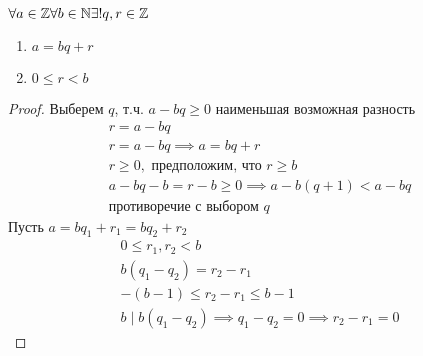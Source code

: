 \documentclass[main]{subfiles}
\begin{document}
\begin{theorem}
    $\forall a \in \mathbb{Z} \forall b \in \mathbb{N} \exists! q,r \in \mathbb{Z}$
    \begin{enumerate}
        \item $a=bq +r$
        \item $0 \le r < b$
    \end{enumerate}
\end{theorem}
\begin{proof}
    Выберем  $q$, т.ч. $a-bq\ge 0$ наименьшая возможная разность
    \begin{gather*}
        r = a-bq\\
        r = a -bq \implies a = bq+r\\
        r \ge 0, \text{ предположим, что } r \ge b\\
        a-bq-b=r-b \ge 0 \implies a - b(q+1) < a -bq\\
        \text{противоречие с выбором } q
    \end{gather*}
    Пусть $a = bq_1 + r_1 = bq_2+r_2$
    \begin{gather*}
        0 \le r_1, r_2 <b \\
        b(q_1-q_2) = r_2-r_1\\
        -(b-1)\le r_2 - r_1 \le b-1\\
        b \mid b(q_1-q_2) \implies q_1-q_2 = 0 \implies r_2-r_1=0
    \end{gather*}
\end{proof}
\end{document}
